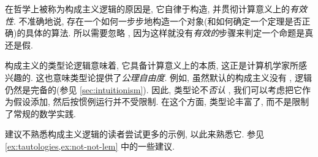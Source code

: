 在哲学上被称为构成主义逻辑的原因是, 它自律于构造, 并贯彻计算意义上的\emph{有效性}.
不准确地说, 存在一个如何一步步地构造一个对象(和如何确定一个定理是否正确)的具体的算法.
所以需要忽略 \LEM{}, 因为这样就没有\emph{有效的}步骤来判定一个命题是真还是假.

构成主义的类型论逻辑意味着, 它具备计算意义上的本质, 这正是计算机学家所感兴趣的.
这也意味类型论提供了\emph{公理自由度}.
 例如, 虽然默认的构成主义没有 \LEM{}, 逻辑仍然是完备的(参见 \cref{sec:intuitionism}).
因此, 类型论不\emph{否认} \LEM{}, 我们可以考虑把它作为假设添加, 然后按惯例运行并不受限制.
在这个方面, 类型论丰富了, 而不是限制了常规的数学实践.

建议不熟悉构成主义逻辑的读者尝试更多的示例, 以此来熟悉它.
参见 \cref{ex:tautologies,ex:not-not-lem} 中的一些建议. 

\mentalpause

